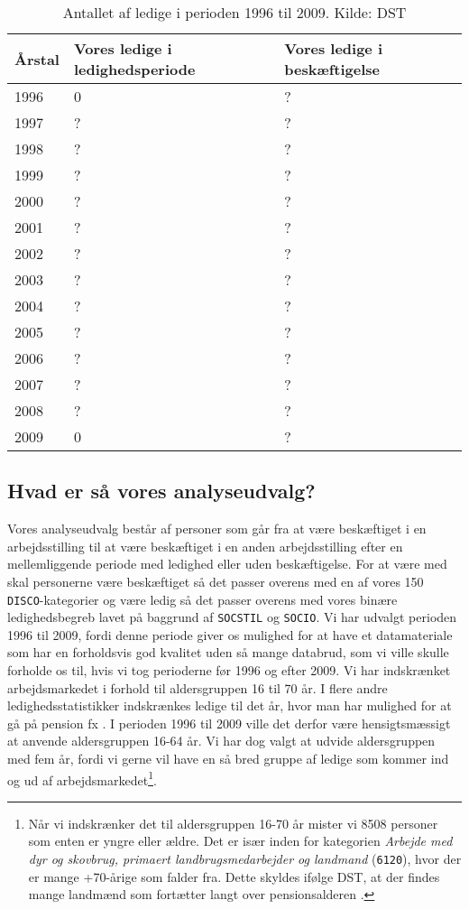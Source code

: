 \begin{table}[H] \centering
\caption{Antallet af ledige i perioden 1996 til 2009. Kilde: DST}
\label{tab_SOCSTIL}
\begin{tabular}{@{}lll@{}} \toprule
Årstal & Vores ledige i ledighedsperiode & Vores ledige i beskæftigelse \\ \midrule
1996  & 0 & ? \\ 
1997  & ? & ? \\ 
1998  & ? & ? \\ 
1999  & ? & ? \\ 
2000  & ? & ? \\ 
2001  & ? & ? \\ 
2002  & ? & ? \\ 
2003  & ? & ? \\ 
2004  & ? & ? \\ 
2005  & ? & ? \\ 
2006  & ? & ? \\ 
2007  & ? & ? \\ 
2008  & ? & ? \\ 
2009  & 0 & ? \\  \bottomrule
\end{tabular} \end{table}
% 


\subsection{Hvad er så vores analyseudvalg? \label{ledig_analyseudvalg}} 

Vores analyseudvalg består af personer som går fra at være beskæftiget i en arbejdsstilling til at være beskæftiget i en anden arbejdsstilling efter en mellemliggende periode med ledighed eller uden beskæftigelse. For at være med skal personerne være beskæftiget så det passer overens med en af vores 150 \texttt{DISCO}-kategorier og være ledig så det passer overens med vores binære ledighedsbegreb lavet på baggrund af \texttt{SOCSTIL} og \texttt{SOCIO}. Vi har udvalgt perioden 1996 til 2009, fordi denne periode giver os mulighed for at have et datamateriale som har en forholdsvis god kvalitet uden så mange databrud, som vi ville skulle forholde os til, hvis vi tog perioderne før 1996 og efter 2009. Vi har indskrænket arbejdsmarkedet i forhold til aldersgruppen 16 til 70 år. I flere andre ledighedsstatistikker indskrænkes ledige til det år, hvor man har mulighed for at gå på pension fx \parencite{Bjoersted2012, Bang-Petersen2012, DST2014a}. I perioden 1996 til 2009 ville det derfor være hensigtsmæssigt at anvende aldersgruppen 16-64 år. Vi har dog valgt at udvide aldersgruppen med fem år, fordi vi gerne vil have en så bred gruppe af ledige som kommer ind og ud af arbejdsmarkedet\footnote{Når vi indskrænker det til aldersgruppen 16-70 år mister vi 8508 personer som enten er yngre eller ældre. Det er især inden for kategorien \emph{Arbejde med dyr og skovbrug, primaert landbrugsmedarbejder og landmand} (\texttt{6120}), hvor der er mange +70-årige som falder fra. Dette skyldes ifølge DST, at der findes mange landmænd som fortætter langt over pensionsalderen \parencite{DST2012}.}.



